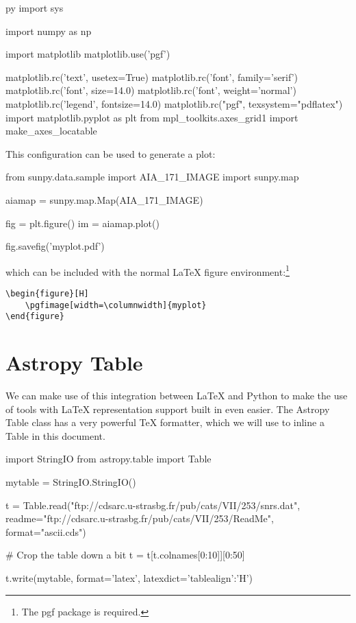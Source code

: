 \documentclass[]{article}
\begin{document}
\begin{pyverbatim}
\begin{pythontexcustomcode}{py}
import sys

import numpy as np

import matplotlib
matplotlib.use('pgf')

matplotlib.rc('text', usetex=True)
matplotlib.rc('font', family='serif')
matplotlib.rc('font', size=14.0)
matplotlib.rc('font', weight='normal')
matplotlib.rc('legend', fontsize=14.0)
matplotlib.rc("pgf", texsystem="pdflatex")
import matplotlib.pyplot as plt
from mpl_toolkits.axes_grid1 import make_axes_locatable


\end{pythontexcustomcode}
\end{pyverbatim}

This configuration can be used to generate a plot:

\begin{pyblock}
from sunpy.data.sample import AIA_171_IMAGE
import sunpy.map

aiamap = sunpy.map.Map(AIA_171_IMAGE)

fig = plt.figure()
im = aiamap.plot()

fig.savefig('myplot.pdf')
\end{pyblock}

which can be included with the normal LaTeX figure environment:\footnote{The pgf package is required.}

\begin{verbatim}
\begin{figure}[H]
	\pgfimage[width=\columnwidth]{myplot}
\end{figure}
\end{verbatim}

\begin{figure}[H]
\end{figure}

\section{Astropy Table}

We can make use of this integration between LaTeX and Python to make the use of tools with LaTeX representation support built in even easier.
The Astropy Table class has a very powerful TeX formatter, which we will use to inline a Table in this document.

\begin{pyblock}
import StringIO
from astropy.table import Table

mytable = StringIO.StringIO()

t = Table.read("ftp://cdsarc.u-strasbg.fr/pub/cats/VII/253/snrs.dat",
	           readme="ftp://cdsarc.u-strasbg.fr/pub/cats/VII/253/ReadMe",
	           format="ascii.cds")

# Crop the table down a bit
t = t[t.colnames[0:10]][0:50]

t.write(mytable, format='latex', latexdict={'tablealign':'H'})

\end{pyblock}
\end{document}
